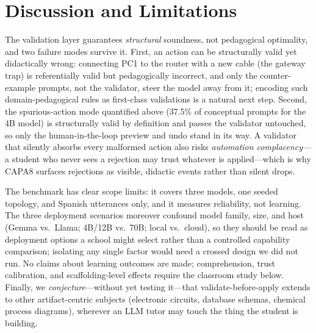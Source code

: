 \documentclass[conference,a4paper]{IEEEtran}
\begin{document}
\section{Discussion and Limitations}
\label{sec:disc}
The validation layer guarantees \emph{structural} soundness, not pedagogical optimality, and two failure modes survive it. First, an action can be structurally valid yet didactically wrong: connecting PC1 to the router with a new cable (the gateway trap) is referentially valid but pedagogically incorrect, and only the counter-example prompts, not the validator, steer the model away from it; encoding such domain-pedagogical rules as first-class validations is a natural next step. Second, the spurious-action mode quantified above (37.5\% of conceptual prompts for the 4B model) is structurally valid by definition and passes the validator untouched, so only the human-in-the-loop preview and undo stand in its way. A validator that silently absorbs every malformed action also risks \emph{automation complacency}---a student who never sees a rejection may trust whatever is applied---which is why CAPA8 surfaces rejections as visible, didactic events rather than silent drops.

The benchmark has clear scope limits: it covers three models, one seeded topology, and Spanish utterances only, and it measures reliability, not learning. The three deployment scenarios moreover confound model family, size, and host (Gemma vs.\ Llama; 4B/12B vs.\ 70B; local vs.\ cloud), so they should be read as deployment options a school might select rather than a controlled capability comparison; isolating any single factor would need a crossed design we did not run. No claims about learning outcomes are made; comprehension, trust calibration, and scaffolding-level effects require the classroom study below. Finally, we \emph{conjecture}---without yet testing it---that validate-before-apply extends to other artifact-centric subjects (electronic circuits, database schemas, chemical process diagrams), wherever an LLM tutor may touch the thing the student is building.
\end{document}

